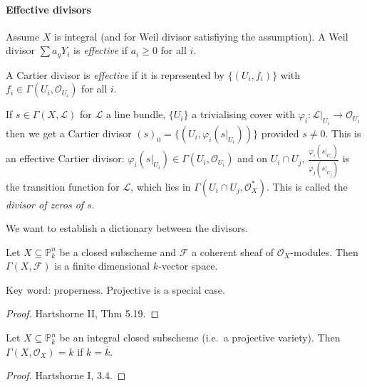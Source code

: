 \documentclass[a4paper]{article}
\renewcommand*{\P}{\mathbb{P}}
\newcommand{\sh}[1]{\mathcal{#1}} %
\begin{document}
\paragraph{Effective divisors}

\begin{definition}
  Assume \(X\) is integral (and for Weil divisor satisfiying the assumption). A Weil divisor \(\sum a_y Y_i\) is \emph{effective} if \(a_i \geq 0\) for all \(i\).

  A Cartier divisor is \emph{effective} if it is represented by \(\{(U_i, f_i)\}\) with \(f_i \in \Gamma(U_i, \sh O_{U_i})\) for all \(i\).
\end{definition}

If \(s \in \Gamma(X, \sh L)\) for \(\sh L\) a line bundle, \(\{U_i\}\) a trivialising cover with \(\varphi_i: \sh L|_{U_i} \to \sh O_{U_i}\) then we get a Cartier divisor \((s)_0 = \{(U_i, \varphi_i(s|_{U_i}))\}\) provided \(s \neq 0\). This is an effective Cartier divisor: \(\varphi_i(s|_{U_i}) \in \Gamma(U_i, \sh O_{U_i})\) and on \(U_i \cap U_j\), \(\frac{\varphi_i(s|_{U_i})}{\varphi_j(s|_{U_j})}\) is the transition function for \(\sh L\), which lies in \(\Gamma(U_i \cap U_j, \sh O_X^*)\). This is called the \emph{divisor of zeros of \(s\)}.

We want to establish a dictionary between the divisors.

\begin{theorem}
  Let \(X \subseteq \P^n_k\) be a closed subscheme and \(\sh F\) a coherent sheaf of \(\sh O_X\)-modules. Then \(\Gamma(X, \sh F)\) is a finite dimensional \(k\)-vector space.
\end{theorem}

Key word: properness. Projective is a special case.

\begin{proof}
  Hartshorne II, Thm 5.19.
\end{proof}

\begin{theorem}
  Let \(X \subseteq \P^n_k\) be an integral closed subscheme (i.e.\ a projective variety). Then \(\Gamma(X, \sh O_X) = k\) if \(k = \overline k\).
\end{theorem}

\begin{proof}
  Hartshorne I, 3.4.
\end{proof}
\end{document}

